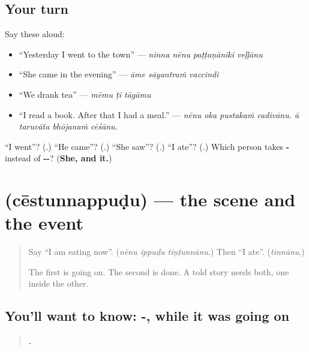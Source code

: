 \subsection*{Your turn}
Say these aloud:

\begin{itemize}
\raggedright
  \item \textquotedblleft{}Yesterday I went to the town\textquotedblright{} — \emph{ninna nēnu paṭṭaṇāniki veḷḷānu}
  \item \textquotedblleft{}She came in the evening\textquotedblright{} — \emph{āme sāyantraṁ vaccindi}
  \item \textquotedblleft{}We drank tea\textquotedblright{} — \emph{mēmu ṭī tāgāmu}
  \item \textquotedblleft{}I read a book. After that I had a meal.\textquotedblright{} — \emph{nēnu oka pustakaṁ cadivānu. ā taruvāta bhōjanaṁ cēśānu.}
\end{itemize}

\begin{tcolorbox}[breakable,colback=teal!4,colframe=teal!35!black,title={Before you move on}]
\textquotedblleft{}I went\textquotedblright{}? (\textbf{}.) \textquotedblleft{}He came\textquotedblright{}? (\textbf{}.) \textquotedblleft{}She saw\textquotedblright{}? (\textbf{}.) \textquotedblleft{}I ate\textquotedblright{}? (\textbf{}.) Which person takes \textbf{-} instead of \textbf{--}? (\textbf{She, and it.})
\end{tcolorbox}
\section[\texorpdfstring{\te{చేస్తున్నప్పుడు} (cēstunnappuḍu)}{చేస్తున్నప్పుడు (cēstunnappuḍu)}]{ (cēstunnappuḍu) — the scene and the event}

\label{lesson:TE-C316-cestunnappudu}



\begin{quote}
Say \textquotedblleft{}I am eating now\textquotedblright{}. (\emph{nēnu ippuḍu tiṇṭunnānu}.) Then \textquotedblleft{}I ate\textquotedblright{}. (\emph{tinnānu}.)

The first is going on. The second is done. A told story needs both, one inside the other.
\end{quote}

\subsection*{You'll want to know: -, while it was going on}
\begin{quote}
\textbf{    .}
\end{quote}

